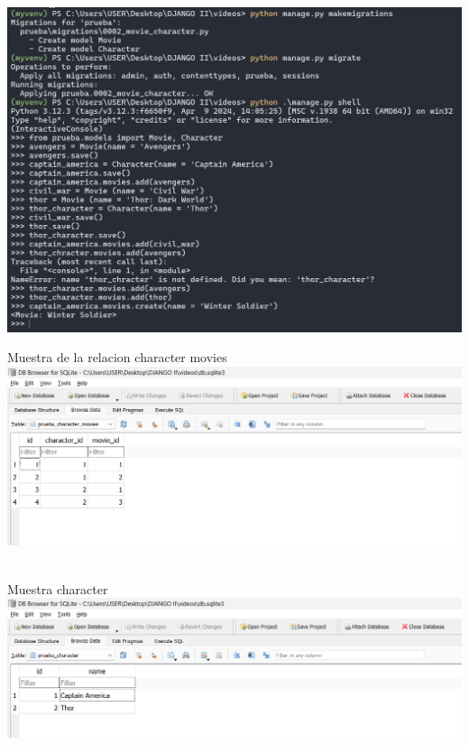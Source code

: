 \documentclass{article}
\begin{document}
        \newline
        \includegraphics[width=1\textwidth,keepaspectratio]{IMAGENES/Evidencia Tercer video I.png}
        \newline \newline \newline\newline \newline
        \item Muestra de la relacion character movies
        \newline \newline\newline
        \includegraphics[width=1\textwidth,keepaspectratio]{IMAGENES/Evidencia Tercer video II.png}
        \newline \
        \item Muestra character
        \newline \newline
        \includegraphics[width=1\textwidth,keepaspectratio]{IMAGENES/Evidencia Tercer video III.png}
\end{document}
